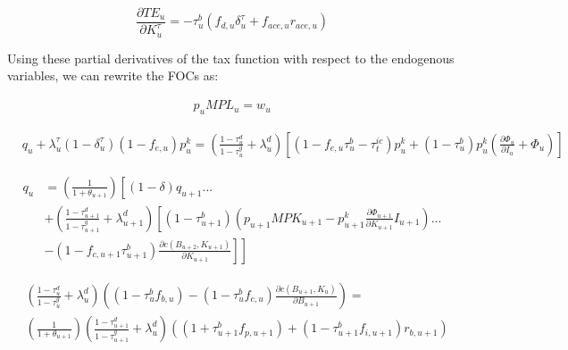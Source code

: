 \begin{equation}
\label{eqn:d_te_b}
\frac{\partial TE_{u}}{\partial K^{\tau}_{u}}= -\tau^{b}_{u}\left(f_{d,u}\delta^{\tau}_{u}+f_{ace,u}r_{ace,u} \right)
\end{equation}


Using these partial derivatives of the tax function with respect to the endogenous variables, we can rewrite the FOCs as:


\begin{equation}
\label{eqn:foc_l_tax}
\begin{split}
 p_{u}MPL_{u} = w_{u} 
 \end{split}
\end{equation}

 \begin{equation}
\label{eqn:foc_i_tax}
\begin{split}
 & q_{u} + \lambda^{\tau}_{u}(1-\delta^{\tau}_{u})(1-f_{e,u})p^{k}_{u} =  \left(\frac{1-\tau^{d}_{u}}{1-\tau^{g}_{u}} + \lambda^{d}_{u}\right)\left[(1-f_{e,u}\tau^{b}_{u} - \tau^{ic}_{t})p^{k}_{u}+ (1-\tau^{b}_{u})p^{k}_{u}\left(\frac{\partial \Phi_{u}}{\partial I_{u}} + \Phi_{u}\right) \right]
\end{split}
\end{equation}


 \begin{equation}
\label{eqn:foc_k_tax}
\begin{split}
 q_{u} & = \left(\frac{1}{1+\theta_{u+1}}\right)\left[(1-\delta)q_{u+1} ... \right. \\
& \left. +  \left(\frac{1-\tau^{d}_{u+1}}{1-\tau^{g}_{u+1}} + \lambda^{d}_{u+1} \right)\left[(1-\tau^{b}_{u+1})\left(p_{u+1}MPK_{u+1}- p^{k}_{u+1}\frac{\partial \Phi_{u+1}}{\partial K_{u+1}}I_{u+1}\right)  ... \right.\right. \\
& \left.\left.-(1-f_{c,u+1}\tau^{b}_{u+1}) \frac{\partial c(B_{u+2},K_{u+1})}{\partial K_{u+1}} \right] \right]
\end{split}
\end{equation}

 \begin{equation}
\label{eqn:foc_b_tax}
\begin{split}
&  \left(\frac{1-\tau^{d}_{u}}{1-\tau^{g}_{u}} + \lambda^{d}_{u} \right)\left((1-\tau^{b}_{u}f_{b,u})-(1-\tau^{b}_{u}f_{c,u})\frac{\partial c(B_{u+1},K_{u})}{\partial B_{u+1}}\right)= \\
&  \left(\frac{1}{1+\theta_{u+1}}\right) \left(\frac{1-\tau^{d}_{u+1}}{1-\tau^{g}_{u+1}} + \lambda^{d}_{u} \right) \left((1+\tau^{b}_{u+1}f_{p,u+1})+(1-\tau^{b}_{u+1}f_{i,u+1})r_{b,u+1}\right)
 \end{split}
\end{equation}

